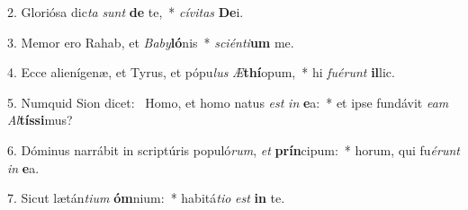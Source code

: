 2. Gloriósa dic\textit{ta} \textit{sunt} \textbf{de} te,~*  \textit{cí}\textit{vi}\textit{tas} \textbf{De}i.\

3. Memor ero Rahab, et \textit{Ba}\textit{by}\textbf{ló}nis~*  \textit{sci}\textit{én}\textit{ti}\textbf{um} me.\

4. Ecce alienígenæ, et Tyrus, et pópu\textit{lus} \textit{Æ}\textbf{thí}opum,~*  hi \textit{fu}\textit{é}\textit{runt} \textbf{il}lic.\

5. Numquid Sion dicet: \dag\  Homo, et homo natus \textit{est} \textit{in} \textbf{e}a:~*  et ipse fundávit \textit{e}\textit{am} \textit{Al}\textbf{tís}\textbf{si}mus?\

6. Dóminus narrábit in scriptúris populó\textit{rum}, \textit{et} \textbf{prín}cipum:~*  horum, qui fu\textit{é}\textit{runt} \textit{in} \textbf{e}a.\

7. Sicut lætán\textit{ti}\textit{um} \textbf{óm}nium:~*  habitá\textit{ti}\textit{o} \textit{est} \textbf{in} te.\

